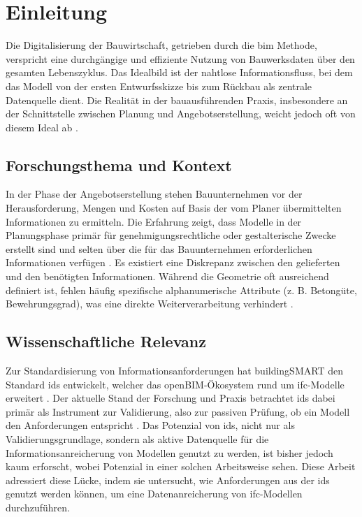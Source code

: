 \section{Einleitung}
\label{sec:intro}

Die Digitalisierung der Bauwirtschaft, getrieben durch die \gls{bim} Methode, verspricht eine durchgängige und 
effiziente Nutzung von Bauwerksdaten über den gesamten Lebenszyklus. 
Das Idealbild ist der nahtlose Informationsfluss, bei dem das Modell von der ersten Entwurfsskizze bis zum Rückbau 
als zentrale Datenquelle dient. Die Realität in der bauausführenden Praxis, 
insbesondere an der Schnittstelle zwischen Planung und Angebotserstellung, weicht jedoch oft von diesem 
Ideal ab \cite{sacks2018bim, borrmann2015building}.

\subsection{Forschungsthema und Kontext}
In der Phase der Angebotserstellung stehen Bauunternehmen vor der Herausforderung, 
Mengen und Kosten auf Basis der vom Planer übermittelten Informationen zu ermitteln. 
Die Erfahrung zeigt, dass Modelle in der Planungsphase primär für genehmigungsrechtliche oder gestalterische 
Zwecke erstellt sind und selten über die für das Bauunternehmen erforderlichen 
Informationen verfügen \cite{sacks2018bim, borrmann2015building, abualdenien2022levels}. 
Es existiert eine Diskrepanz zwischen den gelieferten und den benötigten Informationen. 
Während die Geometrie oft ausreichend definiert ist, fehlen häufig spezifische alphanumerische 
Attribute (z. B. Betongüte, Bewehrungsgrad), was eine direkte Weiterverarbeitung verhindert \cite{sacks2018bim,borrmann2015building}.

\subsection{Wissenschaftliche Relevanz}
Zur Standardisierung von Informationsanforderungen hat buildingSMART den Standard \gls{ids} entwickelt, 
welcher das openBIM-Ökosystem rund um \gls{ifc}-Modelle erweitert \cite{eichler2024bimcert}. 
Der aktuelle Stand der Forschung und Praxis betrachtet \gls{ids} dabei primär als Instrument zur Validierung, 
also zur passiven Prüfung, ob ein Modell den Anforderungen entspricht \cite{eichler2024bimcert,kladz2025ids,buildingsmartIds}. 
Das Potenzial von \gls{ids}, nicht nur als Validierungsgrundlage, sondern als aktive Datenquelle für 
die Informationsanreicherung von Modellen genutzt zu werden, ist bisher jedoch kaum erforscht, wobei 
\cite{kladz2025ids, de2024enriching, amer20235d} Potenzial in einer solchen Arbeitsweise sehen. 
Diese Arbeit adressiert diese Lücke, indem sie untersucht, wie Anforderungen aus der \gls{ids} genutzt 
werden können, um eine Datenanreicherung von \gls{ifc}-Modellen durchzuführen.

